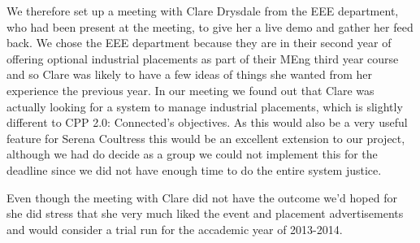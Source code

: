 \begin{itemize}
      We therefore set up a meeting with Clare Drysdale from the EEE department, who had been present at the meeting, to give her a live demo and gather her feed back. We chose the EEE department because they are in their second year of offering  optional industrial placements as part of their MEng third year course and so Clare was likely to have a few ideas of things she wanted from her experience the previous year. In our meeting we found out that Clare was actually looking for a system to manage industrial placements, which is slightly different to CPP 2.0: Connected's objectives. As this would also be a very useful feature for Serena Coultress this would be an excellent extension to our project, although we had do decide as a group we could not implement this for the deadline since we did not have enough time to do the entire system justice.
      
      Even though the meeting with Clare did not have the outcome we'd hoped for she did stress that she very much liked the event and placement advertisements and would consider a trial run for the accademic year of 2013-2014.
    \end{itemize}
   

    